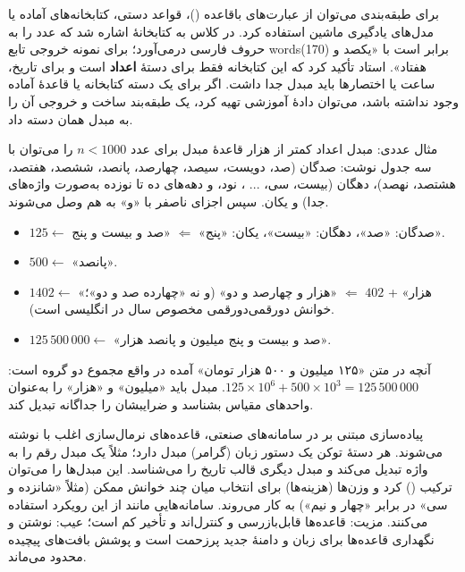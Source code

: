 برای طبقه‌بندی می‌توان از عبارت‌های باقاعده ()، قواعد دستی، کتابخانه‌های آماده یا مدل‌های یادگیری ماشین استفاده کرد. در کلاس به کتابخانهٔ  اشاره شد که عدد را به حروف فارسی درمی‌آورد؛ برای نمونه خروجی تابع words(170) برابر است با «یکصد و هفتاد». استاد تأکید کرد که این کتابخانه فقط برای دستهٔ \textbf{اعداد} است و برای تاریخ، ساعت یا اختصارها باید مبدل جدا داشت. اگر برای یک دسته کتابخانه یا قاعدهٔ آماده وجود نداشته باشد، می‌توان دادهٔ آموزشی تهیه کرد، یک طبقه‌بند ساخت و خروجی آن را به مبدل همان دسته داد.


\begin{addedbox}{مثال عددی: مبدل اعداد کمتر از هزار}
قاعدهٔ مبدل برای عدد $n<1000$ را می‌توان با سه جدول نوشت: صدگان (صد، دویست، سیصد، چهارصد، پانصد، ششصد، هفتصد، هشتصد، نهصد)، دهگان (بیست، سی، ... ، نود، و دهه‌های ده تا نوزده به‌صورت واژه‌های جدا) و یکان. سپس اجزای ناصفر با «و» به هم وصل می‌شوند.
\begin{itemize}
  \item $125 \leftarrow$ صدگان: «صد»، دهگان: «بیست»، یکان: «پنج» $\Leftarrow$ «صد و بیست و پنج».
  \item $500 \leftarrow$ «پانصد».
  \item $1402 \leftarrow$ «هزار» + $402$ $\Leftarrow$ «هزار و چهارصد و دو» (و نه «چهارده صد و دو»؛ خوانش دورقمی‌دورقمی مخصوص سال در انگلیسی است).
  \item $125\,500\,000 \leftarrow$ «صد و بیست و پنج میلیون و پانصد هزار».
\end{itemize}
آنچه در متن «۱۲۵ میلیون و ۵۰۰ هزار تومان» آمده در واقع مجموع دو گروه است: $125 \times 10^6 + 500 \times 10^3 = 125\,500\,000$. مبدل باید «میلیون» و «هزار» را به‌عنوان واحدهای مقیاس بشناسد و ضرایبشان را جداگانه تبدیل کند.
\end{addedbox}

\begin{addedbox}{پیاده‌سازی مبتنی بر }
در سامانه‌های صنعتی، قاعده‌های نرمال‌سازی اغلب با  نوشته می‌شوند. هر دستهٔ توکن یک دستور زبان (گرامر) مبدل دارد؛ مثلاً یک مبدل رقم را به واژه تبدیل می‌کند و مبدل دیگری قالب تاریخ را می‌شناسد. این مبدل‌ها را می‌توان ترکیب () کرد و وزن‌ها (هزینه‌ها) برای انتخاب میان چند خوانش ممکن (مثلاً «شانزده و سی» در برابر «چهار و نیم») به کار می‌روند. سامانه‌هایی مانند  از این رویکرد استفاده می‌کنند. مزیت: قاعده‌ها قابل‌بازرسی و کنترل‌اند و تأخیر کم است؛ عیب: نوشتن و نگهداری قاعده‌ها برای زبان و دامنهٔ جدید پرزحمت است و پوشش بافت‌های پیچیده محدود می‌ماند.
\end{addedbox}

